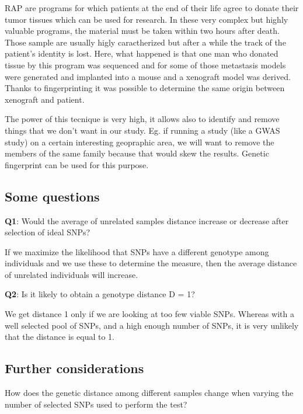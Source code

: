 RAP are programs for which patients at the end of their life agree to donate
their tumor tissues which can be used for research. In these very complex but
highly valuable programs, the material must be taken within two hours after
death. Those sample are usually higly caractherized but after a while the track
of the patient's identity is lost. Here, what happened is that one man who
donated tissue by this program was sequenced and for some of those metastasis
models were generated and implanted into a mouse and a xenograft model was
derived. Thanks to fingerprinting it was possible to determine the same origin
between xenograft and patient. 

The power of this tecnique is very high, it allows also to identify and remove
things that we don't want in our study. Eg. if running a study (like a GWAS
study) on a certain interesting geopraphic area, we will want to remove the
members of the same family because that would skew the results. Genetic
fingerprint can be used for this purpose.

\subsection{Some questions}

\textbf{Q1}: Would the average of unrelated samples distance increase or
decrease after selection of ideal SNPs?

If we maximize the likelihood that SNPs have a different genotype among
individuals and we use these to determine the measure, then the average distance
of unrelated individuals will increase.

\textbf{Q2}: Is it likely to obtain a genotype distance D = 1?

We get distance 1 only if we are looking at too few viable SNPs. Whereas with a
well selected pool of SNPs, and a high enough number of SNPs, it is very
unlikely that the distance is equal to 1.

\subsection{Further considerations}
How does the genetic distance among different samples change when varying the
number of selected SNPs used to perform the test?

